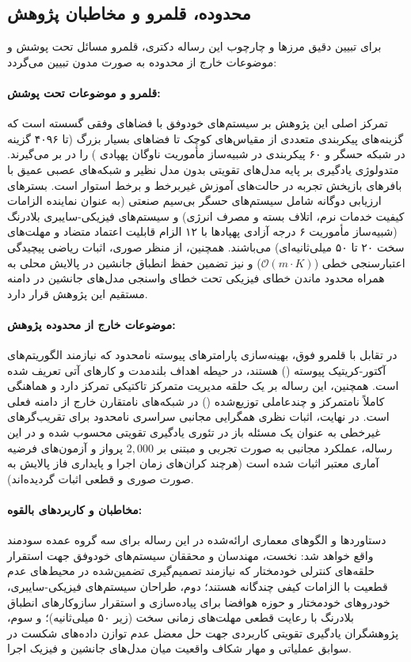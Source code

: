 \documentclass[oneside,openany,phd]{TMU-Thesis}
\begin{document}
\subsection*{محدوده، قلمرو و مخاطبان پژوهش}

برای تبیین دقیق مرزها و چارچوب این رساله دکتری، قلمرو مسائل تحت پوشش و موضوعات خارج از محدوده به صورت مدون تبیین می‌گردد:

\paragraph{قلمرو و موضوعات تحت پوشش:} تمرکز اصلی این پژوهش بر سیستم‌های خودوفق با فضاهای وفقی گسسته است که گزینه‌های پیکربندی متعددی از مقیاس‌های کوچک تا فضاهای بسیار بزرگ (تا ۴۰۹۶ گزینه در شبکه حسگر  و ۶۰ پیکربندی در شبیه‌ساز مأموریت ناوگان پهپادی ) را در بر می‌گیرند. متدولوژی یادگیری بر پایه مدل‌های تقویتی بدون مدل نظیر  و شبکه‌های عصبی عمیق با بافرهای بازپخش تجربه در حالت‌های آموزش غیربرخط و برخط استوار است. بسترهای ارزیابی دوگانه شامل سیستم‌های حسگر بی‌سیم صنعتی (به عنوان نماینده الزامات کیفیت خدمات نرم، اتلاف بسته و مصرف انرژی) و سیستم‌های فیزیکی-سایبری بلادرنگ (شبیه‌ساز مأموریت ۶ درجه آزادی پهپادها با ۱۲ الزام قابلیت اعتماد متضاد و مهلت‌های سخت ۲۰ تا ۵۰ میلی‌ثانیه‌ای) می‌باشند. همچنین، از منظر صوری، اثبات ریاضی پیچیدگی اعتبارسنجی خطی ($\mathcal{O}(m \cdot K)$) و نیز تضمین حفظ انطباق جانشین در پالایش محلی به همراه محدود ماندن خطای فیزیکی تحت خطای واسنجی مدل‌های جانشین در دامنه مستقیم این پژوهش قرار دارد.

\paragraph{موضوعات خارج از محدوده پژوهش:} در تقابل با قلمرو فوق، بهینه‌سازی پارامترهای پیوسته نامحدود که نیازمند الگوریتم‌های آکتور-کریتیک پیوسته () هستند، در حیطه اهداف بلندمدت و کارهای آتی تعریف شده است. همچنین، این رساله بر یک حلقه مدیریت متمرکز تاکتیکی تمرکز دارد و هماهنگی کاملاً نامتمرکز و چندعاملی توزیع‌شده () در شبکه‌های نامتقارن خارج از دامنه فعلی است. در نهایت، اثبات نظری همگرایی مجانبی سراسری نامحدود برای تقریب‌گرهای غیرخطی به عنوان یک مسئله باز در تئوری یادگیری تقویتی محسوب شده و در این رساله، عملکرد مجانبی به صورت تجربی و مبتنی بر $2{,}000$ پرواز و آزمون‌های فرضیه آماری معتبر اثبات شده است (هرچند کران‌های زمان اجرا و پایداری فاز پالایش به صورت صوری و قطعی اثبات گردیده‌اند).

\paragraph{مخاطبان و کاربردهای بالقوه:} دستاوردها و الگوهای معماری ارائه‌شده در این رساله برای سه گروه عمده سودمند واقع خواهد شد: نخست، مهندسان و محققان سیستم‌های خودوفق جهت استقرار حلقه‌های کنترلی خودمختار  که نیازمند تصمیم‌گیری تضمین‌شده در محیط‌های عدم قطعیت با الزامات کیفی چندگانه هستند؛ دوم، طراحان سیستم‌های فیزیکی-سایبری، خودروهای خودمختار و حوزه هوافضا برای پیاده‌سازی و استقرار سازوکارهای انطباق بلادرنگ با رعایت قطعی مهلت‌های زمانی سخت (زیر ۵۰ میلی‌ثانیه)؛ و سوم، پژوهشگران یادگیری تقویتی کاربردی جهت حل معضل عدم توازن داده‌های شکست در سوابق عملیاتی و مهار شکاف واقعیت میان مدل‌های جانشین و فیزیک اجرا.
\end{document}
